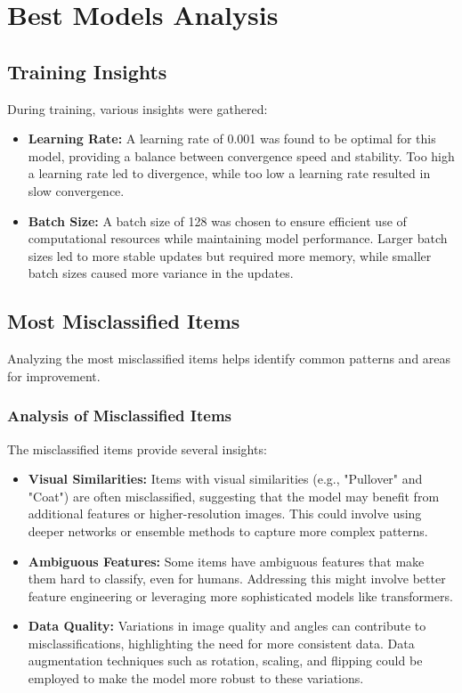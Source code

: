 \documentclass[a4paper,10pt]{article}
\begin{document}
\section{Best Models Analysis}

\subsection{Training Insights}
During training, various insights were gathered:
\begin{itemize}
    \item \textbf{Learning Rate:} A learning rate of 0.001 was found to be optimal for this model, providing a balance between convergence speed and stability. Too high a learning rate led to divergence, while too low a learning rate resulted in slow convergence.
    \item \textbf{Batch Size:} A batch size of 128 was chosen to ensure efficient use of computational resources while maintaining model performance. Larger batch sizes led to more stable updates but required more memory, while smaller batch sizes caused more variance in the updates.
\end{itemize}

\subsection{Most Misclassified Items}
Analyzing the most misclassified items helps identify common patterns and areas for improvement.

\subsubsection{Analysis of Misclassified Items}
The misclassified items provide several insights:
\begin{itemize}
    \item \textbf{Visual Similarities:} Items with visual similarities (e.g., "Pullover" and "Coat") are often misclassified, suggesting that the model may benefit from additional features or higher-resolution images. This could involve using deeper networks or ensemble methods to capture more complex patterns.
    \item \textbf{Ambiguous Features:} Some items have ambiguous features that make them hard to classify, even for humans. Addressing this might involve better feature engineering or leveraging more sophisticated models like transformers.
    \item \textbf{Data Quality:} Variations in image quality and angles can contribute to misclassifications, highlighting the need for more consistent data. Data augmentation techniques such as rotation, scaling, and flipping could be employed to make the model more robust to these variations.
\end{itemize}
\end{document}
